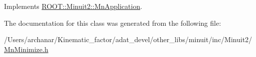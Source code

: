 Implements \mbox{\hyperlink{classROOT_1_1Minuit2_1_1MnApplication_a5a8e1e2658b731b5f4023dd1b1594223}{R\+O\+O\+T\+::\+Minuit2\+::\+Mn\+Application}}.



The documentation for this class was generated from the following file\+:\begin{DoxyCompactItemize}
\item 
/\+Users/archanar/\+Kinematic\+\_\+factor/adat\+\_\+devel/other\+\_\+libs/minuit/inc/\+Minuit2/\mbox{\hyperlink{other__libs_2minuit_2inc_2Minuit2_2MnMinimize_8h}{Mn\+Minimize.\+h}}\end{DoxyCompactItemize}
